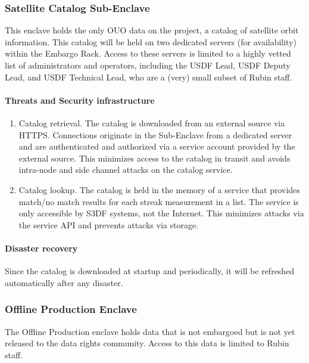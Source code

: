 \subsubsection{Satellite Catalog Sub-\gls{Enclave}} \label{sec:satcat}
This enclave holds the only \gls{OUO} data on the project, a catalog of satellite orbit information.
This catalog will be held on two dedicated servers (for availability) within the Embargo Rack.
Access to these servers is limited to a highly vetted list of administrators and operators, including the \gls{USDF} Lead, \gls{USDF} Deputy Lead, and \gls{USDF} Technical Lead, who are a (very) small subset of Rubin staff.

\paragraph{ Threats and Security infrastructure}
\begin{enumerate}
\item Catalog retrieval.  The catalog is downloaded from an external source via HTTPS.  Connections originate in the Sub-Enclave from a dedicated server and are authenticated and authorized via a service account provided by the external source.  This minimizes access to the catalog in transit and avoids intra-node and side channel attacks on the catalog service.
\item Catalog lookup.  The catalog is held in the memory of a service that provides match/no match results for each streak measurement in a list.  The service is only accessible by S3DF systems, not the Internet.  This minimizes attacks via the service \gls{API} and prevents attacks via storage.
\end{enumerate}

\paragraph{Disaster recovery}
Since the catalog is downloaded at startup and periodically, it will be refreshed automatically after any disaster.

\subsubsection{ Offline Production  \gls{Enclave}}

The Offline Production enclave holds data that is not embargoed but is not yet released to the data rights community.
Access to this data is limited to Rubin staff.

